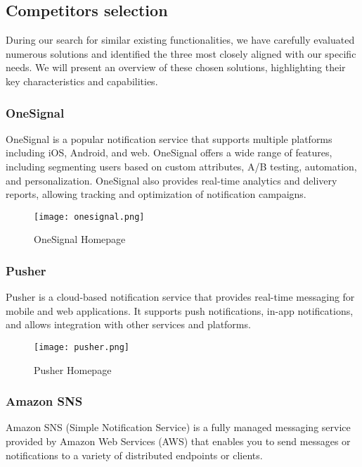 \subsection{Competitors selection}
During our search for similar existing functionalities, we have carefully evaluated numerous solutions 
and identified the three most closely aligned with our specific needs.
We will present an overview of these chosen solutions, highlighting their key characteristics and capabilities.

\subsubsection{OneSignal} 
OneSignal is a popular notification service that supports multiple platforms including iOS, Android, and web. 
OneSignal offers a wide range of features, including segmenting users based on custom attributes, A/B testing, 
automation, and personalization. OneSignal also provides real-time analytics and delivery reports, allowing 
tracking and optimization of notification campaigns.

\begin{figure}[hbt!]
    \centering
    \texttt{[image: onesignal.png]}
    \caption{OneSignal Homepage}
\end{figure}

\subsubsection{Pusher}
Pusher is a cloud-based notification service that provides real-time messaging for mobile and web applications.
It supports push notifications, in-app notifications, and allows integration with other services and platforms. \\

\begin{figure}[hbt!]
    \centering
    \texttt{[image: pusher.png]}
    \caption{Pusher Homepage}
\end{figure}

\subsubsection{Amazon SNS}
Amazon SNS (Simple Notification Service) is a fully managed messaging service provided by Amazon Web 
Services (AWS) that enables you to send messages or notifications to a variety of distributed endpoints 
or clients. \\

